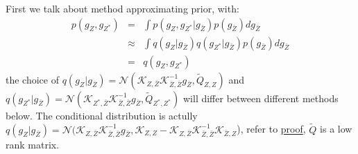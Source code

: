 \documentclass[10pt]{elegantbook}
\begin{document}
First we talk about method approximating prior, with:
\begin{equation}
    \begin{array}{rll}
        p(g_{Z},g_{Z^{*}}) &=& \int p(g_{Z},g_{Z^{*}}|g_{\bar Z})p(g_{\bar Z})d g_{\bar Z} \\ 
        &\approx&\int q(g_{Z}|g_{\bar Z})q(g_{Z^{*}}|g_{\bar Z})p(g_{\bar Z})d g_{\bar Z} \\
        &=& q(g_{Z},g_{Z^{*}})
    \end{array}
\end{equation}
the choice of $q(g_{Z}|g_{\bar Z}) = \mathcal N(\mathscr{K}_{Z, \bar Z}\mathscr{K}_{\bar Z, \bar Z}^{-1}g_{\bar Z}, \tilde Q_{Z, Z})$ 
and $q(g_{Z^{*}}|g_{\bar Z}) = \mathcal N(\mathscr{K}_{Z^*, \bar Z}\mathscr{K}_{\bar Z, \bar Z}^{-1}g_{\bar Z}, \tilde Q_{Z^*, Z^*})$ 
will differ between different methods below. The conditional distribution is actully $q(g_{Z}|g_{\bar Z}) = \mathcal N(\mathscr{K}_{Z,
 \bar Z}\mathscr{K}_{\bar Z, \bar Z}^{-1}g_{\bar Z}, \mathscr{K}_{Z, Z} - \mathscr{K}_{Z, \bar Z}
 \mathscr{K}_{\bar Z, \bar Z}^{-1}\mathscr{K}_{\bar Z, Z}$), 
refer to \href{https://statproofbook.github.io/P/mvn-cond.html}{proof}, $\tilde Q$ is a low rank matrix.
\end{document}
